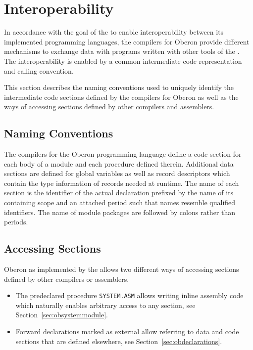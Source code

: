 \obprint
\obcheck
\obdump
\obrun
\obcpp
\obdoc
\obhtml
\oblatex
\obcode
\obamda
\obamdb
\obamdc
\obarma
\obarmb
\obarmc
\obarmcfpe
\obavr
\obavrtt
\obmabk
\obmibl
\obmipsa
\obmipsb
\obmmix
\oborok
\obppca
\obppcb
\obrisc
\obwasm

\section{Interoperability}

In accordance with the goal of the \ecs{} to enable interoperability between its implemented programming languages,
the compilers for Oberon provide different mechanisms to exchange data with programs written with other tools of the \ecs{}.
The interoperability is enabled by a common intermediate code representation and calling convention. \seecode

This section describes the naming conventions used to uniquely identify the intermediate code sections defined by the compilers for Oberon
as well as the ways of accessing sections defined by other compilers and assemblers.

\subsection{Naming Conventions}

The compilers for the Oberon programming language define a code section for each body of a module and each procedure defined therein.
Additional data sections are defined for global variables as well as record descriptors which contain the type information of records needed at runtime.
The name of each section is the identifier of the actual declaration prefixed by the name of its containing scope and an attached period such that names resemble qualified identifiers.
The name of module packages are followed by colons rather than periods.

\subsection{Accessing Sections}\label{sec:obaccessingsections}

Oberon as implemented by the \ecs{} allows two different ways of accessing sections defined by other compilers or assemblers.

\begin{itemize}

\item
The predeclared procedure \texttt{SYSTEM.ASM} allows writing inline assembly code which naturally enables arbitrary access to any section, see Section~\ref{sec:obsystemmodule}.
\seeassembly

\item
Forward declarations marked as external allow referring to data and code sections that are defined elsewhere, see Section~\ref{sec:obdeclarations}.

\end{itemize}

\concludechapter
